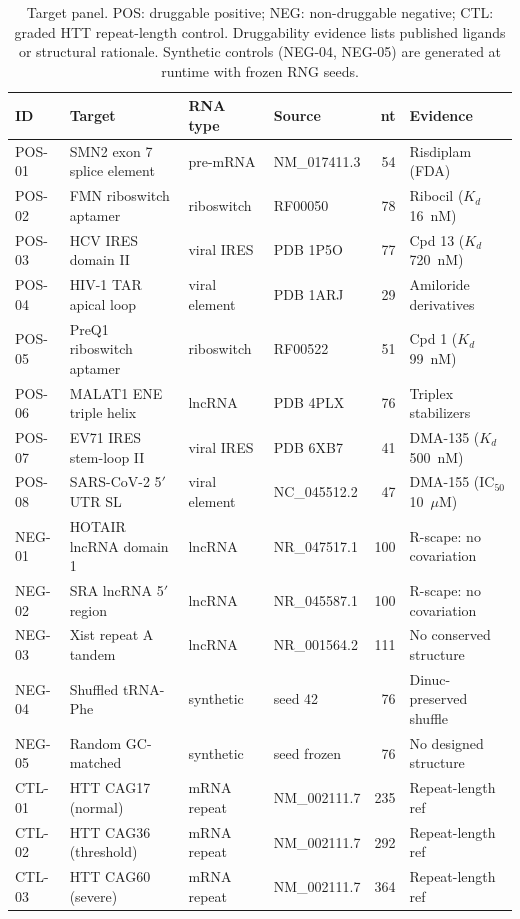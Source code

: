 \documentclass[11pt]{article}
\begin{document}
\begin{table}[htbp]
\centering
\caption{Target panel. POS: druggable positive; NEG: non-druggable
negative; CTL: graded HTT repeat-length control. Druggability evidence lists
published ligands or structural rationale. Synthetic controls (NEG-04,
NEG-05) are generated at runtime with frozen RNG seeds.}
\label{tab:targets}
\small
\begin{tabular}{llllrl}
\toprule
\textbf{ID} & \textbf{Target} & \textbf{RNA type} & \textbf{Source} & \textbf{nt} & \textbf{Evidence} \\
\midrule
POS-01 & SMN2 exon 7 splice element & pre-mRNA & NM\_017411.3 & 54 & Risdiplam (FDA) \\
POS-02 & FMN riboswitch aptamer & riboswitch & RF00050 & 78 & Ribocil ($K_d$ 16~nM) \\
POS-03 & HCV IRES domain II & viral IRES & PDB 1P5O & 77 & Cpd 13 ($K_d$ 720~nM) \\
POS-04 & HIV-1 TAR apical loop & viral element & PDB 1ARJ & 29 & Amiloride derivatives \\
POS-05 & PreQ1 riboswitch aptamer & riboswitch & RF00522 & 51 & Cpd 1 ($K_d$ 99~nM) \\
POS-06 & MALAT1 ENE triple helix & lncRNA & PDB 4PLX & 76 & Triplex stabilizers \\
POS-07 & EV71 IRES stem-loop II & viral IRES & PDB 6XB7 & 41 & DMA-135 ($K_d$ 500~nM) \\
POS-08 & SARS-CoV-2 5$'$ UTR SL & viral element & NC\_045512.2 & 47 & DMA-155 (IC$_{50}$ 10~$\mu$M) \\
\midrule
NEG-01 & HOTAIR lncRNA domain 1 & lncRNA & NR\_047517.1 & 100 & R-scape: no covariation \\
NEG-02 & SRA lncRNA 5$'$ region & lncRNA & NR\_045587.1 & 100 & R-scape: no covariation \\
NEG-03 & Xist repeat A tandem & lncRNA & NR\_001564.2 & 111 & No conserved structure \\
NEG-04 & Shuffled tRNA-Phe & synthetic & seed 42 & 76 & Dinuc-preserved shuffle \\
NEG-05 & Random GC-matched & synthetic & seed frozen & 76 & No designed structure \\
\midrule
CTL-01 & HTT CAG17 (normal) & mRNA repeat & NM\_002111.7 & 235 & Repeat-length ref \\
CTL-02 & HTT CAG36 (threshold) & mRNA repeat & NM\_002111.7 & 292 & Repeat-length ref \\
CTL-03 & HTT CAG60 (severe) & mRNA repeat & NM\_002111.7 & 364 & Repeat-length ref \\
\bottomrule
\end{tabular}
\end{table}
\end{document}
